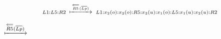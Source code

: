 \begin{frame}{\name}
$$\scriptstyle
L1:L5:R2\enspace\xmapsto{\overset\Longleftarrow{R5}(\overline{Lp})}\enspace L1:x_2(o):{x_3(o):R5:x_3(u)}:x_1(o):L5:x_1(u):x_2(u):R2
$$

\begin{center}
$\xmapsto{\overset\Longleftarrow{R5}(\overline{Lp})}$
\end{center}
\end{frame}